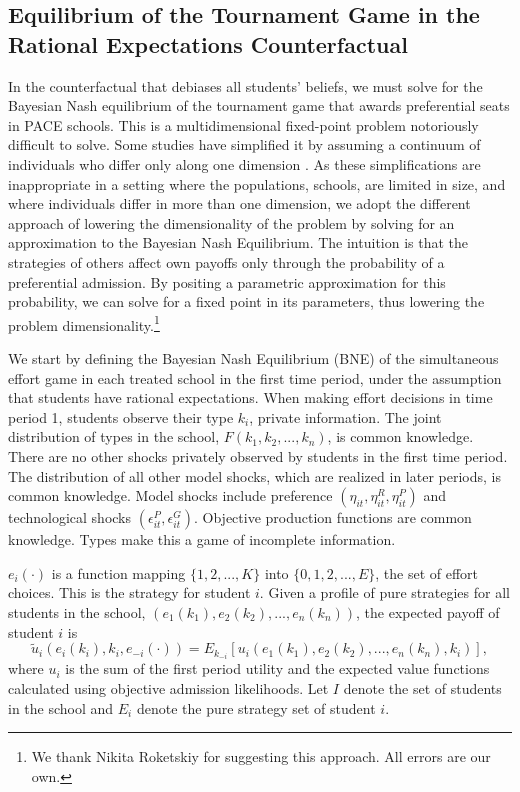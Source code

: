 	
	
	\subsection{Equilibrium of the Tournament Game in the Rational Expectations Counterfactual}\label{sec:algo_re}

	 In the counterfactual that debiases all students' beliefs, we must solve for the Bayesian Nash equilibrium of the tournament game that awards preferential seats in PACE schools. This is a multidimensional fixed-point problem notoriously difficult to solve. Some studies have simplified it by assuming a continuum of individuals who differ only along one dimension \citep{hopkins2004running,hickman2018human,cottonincentive}. As these simplifications are inappropriate in a setting where the populations, schools, are limited in size, and where individuals differ in more than one dimension, we adopt the different approach of lowering the dimensionality of the problem by solving for an approximation to the Bayesian Nash Equilibrium. The intuition is that the strategies of others affect own payoffs only through the probability of a preferential admission. By positing a parametric approximation for this probability, we can solve for a fixed point in its parameters, thus lowering the problem dimensionality.\footnote{ We thank Nikita Roketskiy for suggesting this approach. All errors are our own.  } \par 

     
 We start by defining the Bayesian Nash Equilibrium (BNE) of the simultaneous effort game in each treated school in the first time period, under the assumption that students have rational expectations. When making effort decisions in time period 1, students observe their type $k_i$, private information. The joint distribution of types in the school, $F(k_1,k_2,...,k_n)$, is common knowledge. There are no other shocks privately observed by students in the first time period. The distribution of all other model shocks, which are realized in later periods, is common knowledge. Model shocks include preference $(\eta_{it},\eta_{it}^R,\eta_{it}^P)$ and technological shocks $(\epsilon_{it}^P,\epsilon_{it}^G)$. Objective production functions are common knowledge. Types make this a game of incomplete information.\par
$e_i(\cdot)$ is a function mapping $\{1,2,...,K\}$ into $\{0,1,2,...,E\}$, the set of effort choices. This is the strategy for student $i$. Given a profile of pure strategies for all students in the school, $(e_1(k_1),e_2(k_2),..., e_n(k_n))$, the expected payoff of student $i$ is
$$\tilde{u}_i(e_i(k_i),k_i,e_{-i}(\cdot))=E_{k_{-i}}[u_i(e_1(k_1),e_2(k_2),..., e_n(k_n),k_i)],$$
where $u_i$ is the sum of the first period utility and the expected value functions calculated using objective admission likelihoods. Let $I$ denote the set of students in the school and $E_i$ denote the pure strategy set of student $i$.

